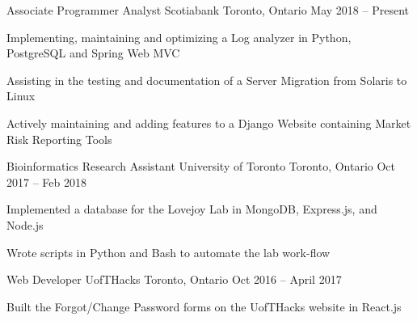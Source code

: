 \begin{cventries}
\cventry
    {Associate Programmer Analyst}
    {Scotiabank}
    {Toronto, Ontario}
    {May 2018 -- Present}
    {
      \begin{cvitems}
        \item {Implementing, maintaining and optimizing a Log analyzer in Python, PostgreSQL and Spring Web MVC}
        \item {Assisting in the testing and documentation of a Server Migration from Solaris to Linux}
        \item {Actively maintaining and adding features to a Django Website containing Market Risk Reporting Tools}
      \end{cvitems}
    }

\cventry
    {Bioinformatics Research Assistant}
    {University of Toronto}
    {Toronto, Ontario}
    {Oct 2017 -- Feb 2018}
    {
      \begin{cvitems}
        \item {Implemented a database for the Lovejoy Lab in MongoDB, Express.js, and Node.js}
        \item {Wrote scripts in Python and Bash to automate the lab work-flow}
      \end{cvitems}
    }
\cventry
    {Web Developer}
    {UofTHacks}
    {Toronto, Ontario}
    {Oct 2016 -- April 2017}
    {
      \begin{cvitems}
        \item {Built the Forgot/Change Password forms on the UofTHacks website in React.js}
      \end{cvitems}
    }
\end{cventries}
